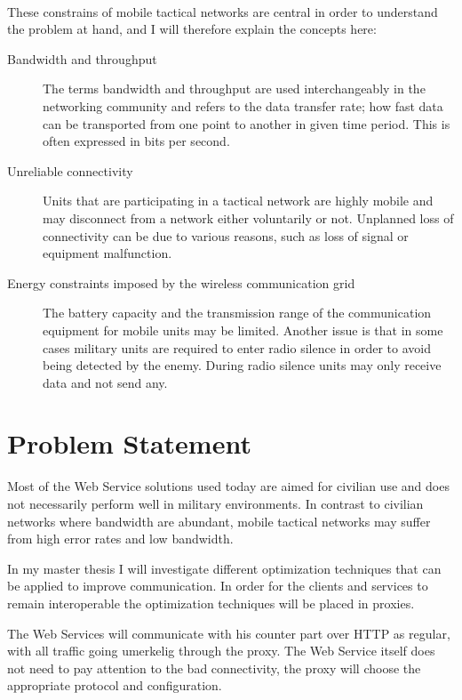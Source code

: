 \documentclass[USenglish]{article}
\begin{document}
\paragraph{}
These constrains of mobile tactical networks are central in order to understand the problem at hand, and I will therefore explain the concepts here:

\begin{description}
\item[Bandwidth and throughput] The terms bandwidth and throughput are used interchangeably in the networking community and refers to the data transfer rate; how fast data can be transported from one point to another in given time period. This is often expressed in bits per second.
\item[Unreliable connectivity] Units that are participating in a tactical network are highly mobile and may disconnect from a network either voluntarily or not. Unplanned loss of connectivity can be due to various reasons, such as loss of signal or equipment malfunction.
\item[Energy constraints imposed by the wireless communication grid] The battery capacity and the transmission range of the communication equipment for mobile units may be limited. Another issue is that in some cases military units are required to enter radio silence in order to avoid being detected by the enemy. During radio silence units may only receive data and not send any.
\end{description}

\section{Problem Statement}
Most of the Web Service solutions used today are aimed for civilian use and does
not necessarily perform well in military environments. In contrast to civilian
networks where bandwidth are abundant, mobile tactical networks may suffer
from high error rates and low bandwidth.

In my master thesis I will investigate different optimization techniques that
can be applied to improve communication. In order for the clients and services
 to remain interoperable the optimization techniques will be placed in proxies.

The Web Services will communicate with his counter part over HTTP as regular,
with all traffic going umerkelig through the proxy. The Web Service itself does
not need to pay attention to the bad connectivity, the proxy will choose the
appropriate protocol and configuration.
\end{document}
